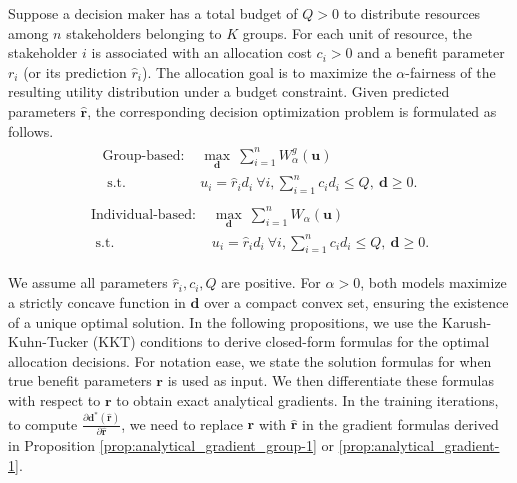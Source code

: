 \documentclass[ijoc,sglanonrev]{informs4}
\begin{document}
Suppose a decision maker has a total budget of $Q > 0$ to distribute resources among $n$ stakeholders belonging to $K$ groups. For each unit of resource, the stakeholder $i$ is associated with an allocation cost $c_i > 0$ and a benefit parameter $r_i$ (or its prediction $\hat{r}_i$). The allocation goal is to maximize the $\alpha$-fairness of the resulting utility distribution under a budget constraint. Given predicted parameters $\hat{\mathbf{r}}$, the corresponding decision optimization problem is formulated as follows.
\begin{gather} \label{eqsys:alpha-g}
\begin{aligned}
\text{Group-based: }
    & \max_{\mathbf{d}} ~ \sum_{i=1}^n W_{\alpha}^g (\mathbf{u}) \\
    \text{ s.t. } & u_i = \hat{r}_id_i ~ \forall i, \sum_{i=1}^n c_id_i \leq Q, ~\mathbf{d} \geq 0.
\end{aligned}
\end{gather}
\begin{gather} \label{eqsys:alpha-ind}
\begin{aligned}
\text{Individual-based: }
    & \max_{\mathbf{d}} ~ \sum_{i=1}^n W_{\alpha} (\mathbf{u}) \\
    \text{ s.t. } & u_i = \hat{r}_id_i ~ \forall i, \sum_{i=1}^n c_id_i \leq Q, ~\mathbf{d} \geq 0.
\end{aligned}
\end{gather}

We assume all parameters $\hat{r}_i, c_i, Q$ are positive. For $\alpha > 0$, both models maximize a strictly concave function in $\mathbf{d}$ over a compact convex set, ensuring the existence of a unique optimal solution.  
In the following propositions, we use the Karush-Kuhn-Tucker (KKT) conditions to derive closed-form formulas for the optimal allocation decisions. For notation ease, we state the solution formulas for when true benefit parameters $\mathbf{r}$ is used as input. We then differentiate these formulas with respect to $\mathbf{r}$ to obtain exact analytical gradients. In the training iterations, to compute $\frac{\partial \mathbf{d}^*(\hat{\mathbf{r}})}{\partial \hat{\mathbf{r}}}$, we need to replace $\mathbf{r}$ with $\hat{\mathbf{r}}$ in the gradient formulas derived in Proposition \ref{prop:analytical_gradient_group-1} or \ref{prop:analytical_gradient-1}.
\end{document}
